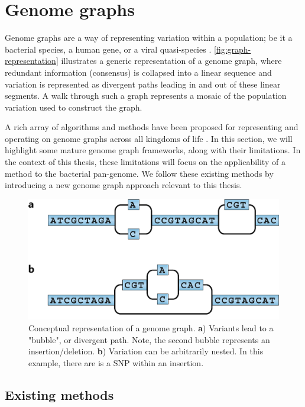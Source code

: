 \section{Genome graphs}

Genome graphs are a way of representing variation within a population; be it a bacterial species, a human gene, or a viral quasi-species \cite{comp-pan-genomics}. \autoref{fig:graph-representation} illustrates a generic representation of a genome graph, where redundant information (consensus) is collapsed into a linear sequence and variation is represented as divergent paths leading in and out of these linear segments. A walk through such a graph represents a mosaic of the population variation used to construct the graph. 

A rich array of algorithms and methods have been proposed for representing and operating on genome graphs across all kingdoms of life \cite{Sherman2020,Eizenga2020,comp-pan-genomics}. In this section, we will highlight some mature genome graph frameworks, along with their limitations. In the context of this thesis, these limitations will focus on the applicability of a method to the bacterial pan-genome. We follow these existing methods by introducing a new genome graph approach relevant to this thesis.

\begin{figure}
\centering
\includegraphics[width=0.75\columnwidth]{Chapter0/Figs/graph-representation.png}
\caption{Conceptual representation of a genome graph. \textbf{a}) Variants lead to a "bubble", or divergent path. Note, the second bubble represents an insertion/deletion. \textbf{b}) Variation can be arbitrarily nested. In this example, there are is a SNP within an insertion.}
\label{fig:graph-representation}
\end{figure}

\subsection{Existing methods}
\label{sec:graphs-existing}
